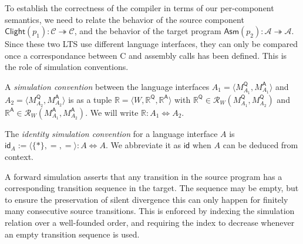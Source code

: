 \documentclass[sigplan,10pt,review,anonymous]{acmart}\settopmatter{printfolios=true,printccs=false,printacmref=false}
\newcommand{\kw}[1]{\ensuremath{ \mathsf{#1} }}
\begin{document}
To establish the correctness of the compiler
in terms of our per-component semantics,
we need to relate the behavior of the source component
$\kw{Clight}(p_1) : \mathcal{C} \twoheadrightarrow \mathcal{C}$,
and the behavior of the target program
$\kw{Asm}(p_2) : \mathcal{A} \twoheadrightarrow \mathcal{A}$.
Since these two LTS
use different language interfaces,
they can only be compared once a correspondance between
C and assembly calls has been defined.
This is the role of simulation conventions.

\begin{definition} %
A \emph{simulation convention} between the language interfaces
$A_1 = \langle M_{A_1}^\kw{Q}, M_{A_1}^\kw{A} \rangle$ and
$A_2 = \langle M_{A_2}^\kw{Q}, M_{A_2}^\kw{A} \rangle$
is as a tuple $\mathbb{R} = \langle W, \mathbb{R}^\kw{Q}, \mathbb{R}^\kw{A} \rangle$
with $\mathbb{R}^\kw{Q} \in \mathcal{R}_W(M_{A_1}^\kw{Q}, M_{A_2}^\kw{Q})$
and $\mathbb{R}^\kw{A} \in \mathcal{R}_W(M_{A_1}^\kw{A}, M_{A_2}^\kw{A})$.
We will write $\mathbb{R} : A_1 \Leftrightarrow A_2$.
\end{definition}

\begin{definition} %
The \emph{identity simulation convention} for
a language interface $A$ is
$\kw{id}_A := \langle \{*\}, {=}, {=} \rangle : A \Leftrightarrow A$.
We abbreviate it as $\kw{id}$ when $A$ can be deduced
from context.
\end{definition}


A forward simulation asserts that any transition in the source program
has a corresponding transition sequence in the target.
The sequence may be empty,
but to ensure the preservation of silent divergence
this can only happen for finitely many consecutive source transitions.
This is enforced by indexing the simulation relation
over a well-founded order,
and requiring the index to decrease
whenever an empty transition sequence is used.
\end{document}
